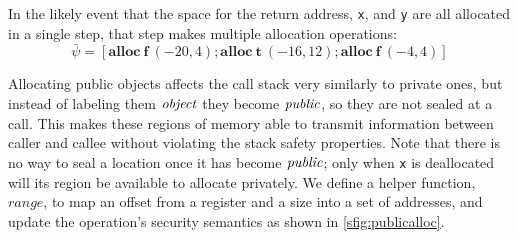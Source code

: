 \documentclass[10pt,conference]{ieeetran}%
\theoremstyle{definition}
\begin{document}
In the likely event that the space for the return address, {\tt x}, and {\tt y}
are all allocated in a single step, that step makes multiple allocation operations:
\[\bar{\psi} = [\mathbf{alloc} ~ \mathbf{f} ~ (-20,4);
 \mathbf{alloc} ~ \mathbf{t} ~ (-16,12) ; \mathbf{alloc} ~ \mathbf{f} ~ (-4,4)]\]

Allocating public objects affects the call stack very similarly to private ones,
but instead of labeling them \(\mathit{object}\) they become \(\mathit{public}\), so they are
not sealed at a call. This makes these
regions of memory able to transmit information between caller and callee without
violating the stack safety properties. Note that there is no way to seal a location
once it has become \(\mathit{public}\); only when {\tt x} is deallocated will its region
be available to allocate privately. We define a helper function, \(\mathit{range}\),
to map an offset from a register and a size into a set of addresses, and update
the operation's security semantics as shown in \cref{sfig:publicalloc}.
\end{document}
